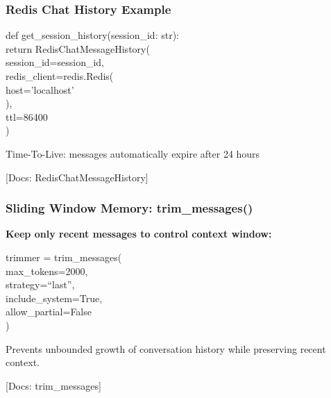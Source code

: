 \documentclass[aspectratio=169,11pt]{beamer}
\newcommand{\docref}[1]{{\scriptsize\color{docgray}[Docs: #1]}}
\begin{document}
\begin{frame}
  \frametitle{Redis Chat History Example}
  \begin{codebox}
    \ttfamily\small
    def get\_session\_history(session\_id: str): \\
    \hspace{2em} return RedisChatMessageHistory( \\
    \hspace{4em} session\_id=session\_id, \\
    \hspace{4em} redis\_client=redis.Redis( \\
    \hspace{6em} host='localhost' \\
    \hspace{4em} ), \\
    \hspace{4em} ttl=86400 \\
    \hspace{2em} )
  \end{codebox}
  \vspace{0.6em}
  \begin{tipbox}
    Time-To-Live: messages automatically expire after 24 hours
  \end{tipbox}
  \docref{RedisChatMessageHistory}
\end{frame}

\begin{frame}
  \frametitle{Sliding Window Memory: trim\_messages()}
  \textbf{Keep only recent messages to control context window:}
  \vspace{0.6em}
  \begin{codebox}
    \ttfamily\small
    trimmer = trim\_messages( \\
    \hspace{2em} max\_tokens=2000, \\
    \hspace{2em} strategy=``last'', \\
    \hspace{2em} include\_system=True, \\
    \hspace{2em} allow\_partial=False \\
    )
  \end{codebox}
  \vspace{0.6em}
  \begin{conceptbox}[Effect]
    Prevents unbounded growth of conversation history while preserving recent context.
  \end{conceptbox}
  \docref{trim\_messages}
\end{frame}
\end{document}
